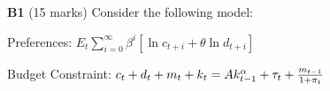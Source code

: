 %
%
%
%
%


\textbf{B1} (15 marks) Consider the following model:

Preferences: $E_t\sum_{i=0}^{\infty}\beta^i[\ln c_{t+i}+\theta \ln  d_{t+i}]$

Budget Constraint:  $c_t+d_t+m_t+k_t=Ak_{t-1}^{\alpha}+\tau_t+\frac{m_{t-1}}{%
1+\pi_t}$

